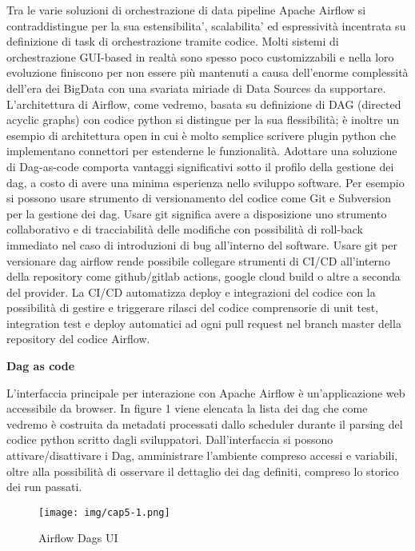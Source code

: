 \documentclass[a4paper,12pt]{report}
\begin{document}
Tra le varie soluzioni di orchestrazione di data pipeline Apache Airflow si contraddistingue per la sua estensibilita’, scalabilita’ ed espressività incentrata su definizione di task di orchestrazione tramite codice.
Molti sistemi di orchestrazione GUI-based in realtà sono spesso poco customizzabili e nella loro evoluzione finiscono per non essere più mantenuti a causa dell'enorme complessità dell'era dei BigData con una svariata miriade di Data Sources da supportare.
L'architettura di Airflow, come vedremo, basata su definizione di DAG (directed acyclic graphs) con codice python si distingue per la sua flessibilità; è inoltre  un esempio di architettura open in cui è molto semplice scrivere plugin python che implementano connettori per estenderne le funzionalità.
\noindent
Adottare una soluzione di Dag-as-code comporta vantaggi significativi sotto il profilo della gestione dei dag, a costo di avere una minima esperienza nello sviluppo software. Per esempio si possono usare strumento di versionamento del codice come Git e Subversion per la gestione dei dag. Usare git significa avere a disposizione uno strumento collaborativo e di tracciabilità delle modifiche con  possibilità di roll-back immediato nel caso di introduzioni di bug all’interno del software.
\noindent
Usare git per versionare dag airflow rende possibile collegare strumenti di CI/CD all’interno della repository come github/gitlab actions, google cloud build o altre a seconda del provider. La CI/CD automatizza deploy e integrazioni del codice con la possibilità di gestire e triggerare rilasci del codice comprensorie di unit test, integration test e  deploy automatici ad ogni pull request nel branch master della repository del codice Airflow.

\textbf{Dag as code}

\noindent
L’interfaccia principale per interazione con Apache Airflow è un’applicazione web accessibile da browser. In figure 1 viene elencata la lista dei dag che come vedremo è costruita da metadati processati dallo scheduler durante il parsing del codice python scritto dagli sviluppatori.
Dall’interfaccia si possono attivare/disattivare i Dag, amministrare l’ambiente compreso accessi e variabili, oltre alla possibilità di osservare il dettaglio dei dag definiti, compreso lo storico dei run passati.

\begin{figure}[h]
    \centering
    \texttt{[image: img/cap5-1.png]}
    \caption{Airflow Dags UI}
\end{figure}
\end{document}
